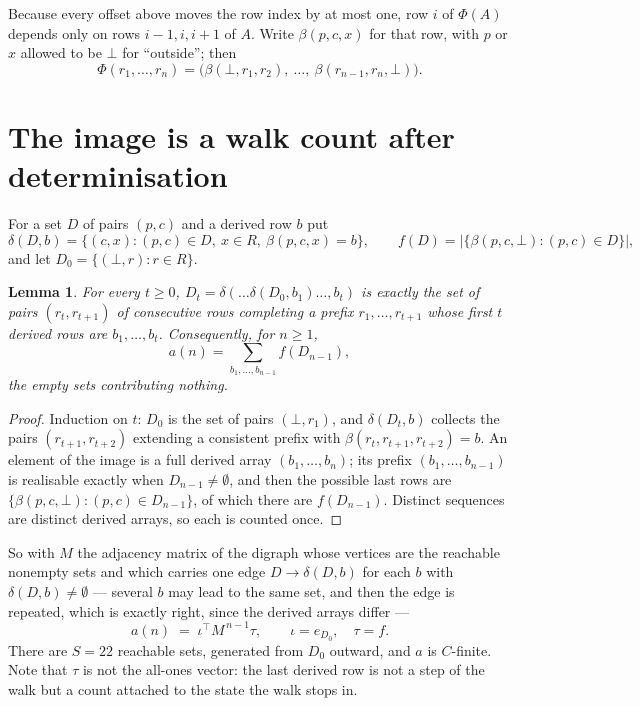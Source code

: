 \documentclass[11pt,a4paper]{article}
\theoremstyle{plain}
\newtheorem{lemma}[theorem]{Lemma}
\theoremstyle{definition}
\begin{document}
Because every offset above moves the row index by at most one, row $i$ of
$\Phi(A)$ depends only on rows $i-1,i,i+1$ of $A$. Write $\beta(p,c,x)$ for that row, with $p$
or $x$ allowed to be $\bot$ for ``outside''; then
\[
\Phi(r_1,\dots,r_n)=\bigl(\beta(\bot,r_1,r_2),\ \dots,\ \beta(r_{n-1},r_n,\bot)\bigr).
\]

\section{The image is a walk count after determinisation}

For a set $D$ of pairs $(p,c)$ and a derived row $b$ put
\[
\delta(D,b)=\{(c,x):(p,c)\in D,\ x\in R,\ \beta(p,c,x)=b\},\qquad
f(D)=\bigl|\{\beta(p,c,\bot):(p,c)\in D\}\bigr| ,
\]
and let $D_0=\{(\bot,r):r\in R\}$.

\begin{lemma}\label{lem:det}
For every $t\ge0$, $D_t=\delta(\dots\delta(D_0,b_1)\dots,b_t)$ is exactly the set of pairs
$(r_t,r_{t+1})$ of consecutive rows completing a prefix $r_1,\dots,r_{t+1}$ whose first $t$
derived rows are $b_1,\dots,b_t$. Consequently, for $n\ge1$,
\[
a(n)=\sum_{b_1,\dots,b_{n-1}}f(D_{n-1}),
\]
the empty sets contributing nothing.
\end{lemma}

\begin{proof}
Induction on $t$: $D_0$ is the set of pairs $(\bot,r_1)$, and $\delta(D_t,b)$ collects the
pairs $(r_{t+1},r_{t+2})$ extending a consistent prefix with
$\beta(r_t,r_{t+1},r_{t+2})=b$. An element of the image is a full derived array
$(b_1,\dots,b_n)$; its prefix $(b_1,\dots,b_{n-1})$ is realisable exactly when
$D_{n-1}\neq\emptyset$, and then the possible last rows are
$\{\beta(p,c,\bot):(p,c)\in D_{n-1}\}$, of which there are $f(D_{n-1})$. Distinct sequences
are distinct derived arrays, so each is counted once.
\end{proof}

So with $M$ the adjacency matrix of the digraph whose vertices are the reachable nonempty sets
and which carries one edge $D\to\delta(D,b)$ for each $b$ with $\delta(D,b)\neq\emptyset$ ---
several $b$ may lead to the same set, and then the edge is repeated, which is exactly right,
since the derived arrays differ ---
\[
a(n)\;=\;\iota^{\!\top}M^{\,n-1}\tau,\qquad \iota=e_{D_0},\quad \tau=f .
\]
There are $S=22$ reachable sets, generated from $D_0$ outward, and $a$ is $C$-finite.
Note that $\tau$ is not the all-ones vector: the last derived row is not a
step of the walk but a count attached to the state the walk stops in.
\end{document}
